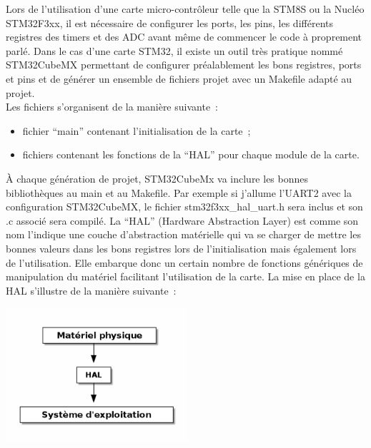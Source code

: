 \documentclass{article}
\begin{document}
Lors de l'utilisation d'une carte micro-contrôleur telle que la STM8S ou la Nucléo STM32F3xx, il est nécessaire de configurer les ports, les pins, les différents registres des timers et des ADC avant même de commencer le code à proprement parlé. Dans le cas d'une carte STM32, il existe un outil très pratique nommé STM32CubeMX permettant de configurer préalablement les bons registres, ports et pins et de générer un ensemble de fichiers projet avec un Makefile adapté au projet. \\

Les fichiers s'organisent de la manière suivante~: \\
\begin{itemize}
  \item fichier ``main'' contenant l'initialisation de la carte~;
  \item fichiers contenant les fonctions de la ``HAL'' pour chaque module de la carte. \\
\end{itemize}

À chaque génération de projet, STM32CubeMx va inclure les bonnes bibliothèques au main et au Makefile. Par exemple si j'allume l'UART2 avec la configuration STM32CubeMX, le fichier stm32f3xx\_hal\_uart.h sera inclus et son .c associé sera compilé. La ``HAL'' (Hardware Abstraction Layer) est comme son nom l'indique une couche d'abstraction matérielle qui va se charger de mettre les bonnes valeurs dans les bons registres lors de l'initialisation mais également lors de l'utilisation. Elle embarque donc un certain nombre de fonctions génériques de manipulation du matériel facilitant l'utilisation de la carte. La mise en place de la HAL s'illustre de la manière suivante~:\\

\begin{center}
  \includegraphics[height=5cm]{diag_HAL.png}
\end{center}
\end{document}
